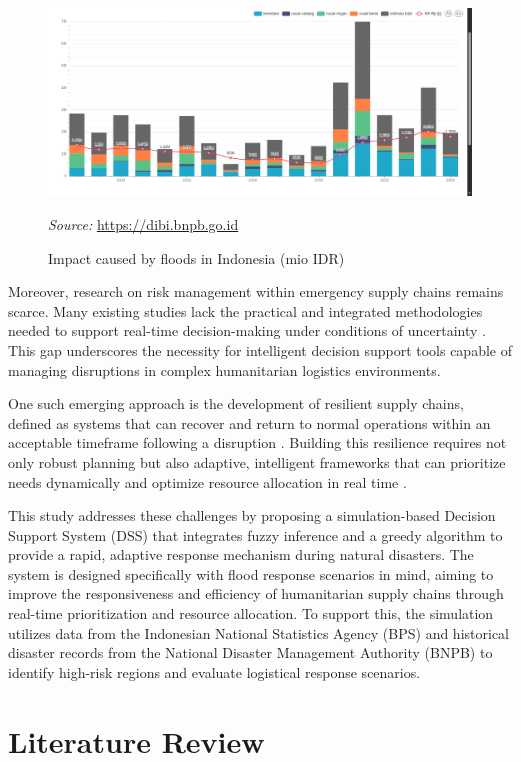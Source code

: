 \documentclass[journal,final,a4paper,twoside,11pt]{IEEEtran}
\begin{document}
\begin{figure}[htbp]
    \centerline{\includegraphics[width=0.8\linewidth]{fig2.png}}
    \caption{Impact caused by floods in Indonesia (mio IDR)}
    \label{fig:floodimpact}
    \vspace{0.2cm}
\footnotesize{\textit{Source:} \url{https://dibi.bnpb.go.id}}
\end{figure}

Moreover, research on risk management within emergency supply chains remains scarce. Many existing studies lack the practical and integrated methodologies needed to support real-time decision-making under conditions of uncertainty \cite{chukwuka2023comprehensive}. This gap underscores the necessity for intelligent decision support tools capable of managing disruptions in complex humanitarian logistics environments.

One such emerging approach is the development of resilient supply chains, defined as systems that can recover and return to normal operations within an acceptable timeframe following a disruption \cite{orengo2022food}. Building this resilience requires not only robust planning but also adaptive, intelligent frameworks that can prioritize needs dynamically and optimize resource allocation in real time \cite{ramirez2020sustainability}.

This study addresses these challenges by proposing a simulation-based Decision Support System (DSS) that integrates fuzzy inference and a greedy algorithm to provide a rapid, adaptive response mechanism during natural disasters. The system is designed specifically with flood response scenarios in mind, aiming to improve the responsiveness and efficiency of humanitarian supply chains through real-time prioritization and resource allocation. To support this, the simulation utilizes data from the Indonesian National Statistics Agency (BPS) and historical disaster records from the National Disaster Management Authority (BNPB) to identify high-risk regions and evaluate logistical response scenarios.

\section{Literature Review}
\end{document}
